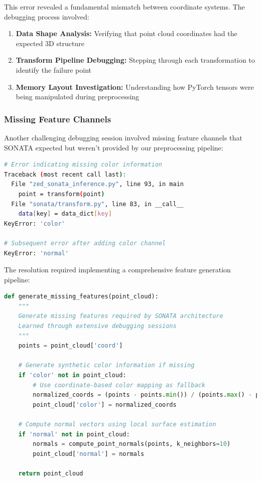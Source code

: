 \documentclass[12pt,a4paper]{report}
\begin{document}
This error revealed a fundamental mismatch between coordinate systems. The debugging process involved:

\begin{enumerate}
    \item \textbf{Data Shape Analysis:} Verifying that point cloud coordinates had the expected 3D structure
    \item \textbf{Transform Pipeline Debugging:} Stepping through each transformation to identify the failure point
    \item \textbf{Memory Layout Investigation:} Understanding how PyTorch tensors were being manipulated during preprocessing
\end{enumerate}

\subsubsection{Missing Feature Channels}

Another challenging debugging session involved missing feature channels that SONATA expected but weren't provided by our preprocessing pipeline:

\begin{lstlisting}[caption=Feature Channel Debugging Process, label=lst:feature_debugging, language=bash]
# Error indicating missing color information
Traceback (most recent call last):
  File "zed_sonata_inference.py", line 93, in main
    point = transform(point)
  File "sonata/transform.py", line 83, in __call__
    data[key] = data_dict[key]
KeyError: 'color'

# Subsequent error after adding color channel
KeyError: 'normal'
\end{lstlisting}

The resolution required implementing a comprehensive feature generation pipeline:

\begin{lstlisting}[caption=Feature Generation for SONATA Compatibility, label=lst:feature_generation, language=python]
def generate_missing_features(point_cloud):
    """
    Generate missing features required by SONATA architecture
    Learned through extensive debugging sessions
    """
    points = point_cloud['coord']
    
    # Generate synthetic color information if missing
    if 'color' not in point_cloud:
        # Use coordinate-based color mapping as fallback
        normalized_coords = (points - points.min()) / (points.max() - points.min())
        point_cloud['color'] = normalized_coords
    
    # Compute normal vectors using local surface estimation
    if 'normal' not in point_cloud:
        normals = compute_point_normals(points, k_neighbors=10)
        point_cloud['normal'] = normals
    
    return point_cloud
\end{lstlisting}
\end{document}
